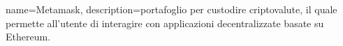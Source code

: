 {
	name={Metamask},
	description={portafoglio per custodire criptovalute, il quale permette all'utente di interagire con applicazioni decentralizzate basate su Ethereum.}
}